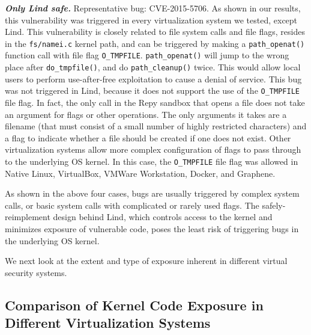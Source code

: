 {{{\emph{\textbf{Only Lind safe.}}  Representative bug: CVE-2015-5706. As
shown in our results, this vulnerability was triggered in every
virtualization system we tested, except Lind. This vulnerability
is closely related to file system calls and file flags, resides in the \texttt{fs/namei.c}
kernel path, and can be triggered by making a \texttt{path\_openat()} function
call with file flag \texttt{O\_TMPFILE}. \texttt{path\_openat()} will jump to the wrong
place after \texttt{do\_tmpfile()}, and do \texttt{path\_cleanup()} twice. This would
allow local users to perform use-after-free exploitation to cause a denial of service.
This bug was not triggered in Lind, because it does not support the use of the
\texttt{O\_TMPFILE} file flag. In fact, the only call in the Repy sandbox that
opens a file does not take an argument for flags or other operations.  The
only arguments it takes are a filename (that must consist of a small number
of highly restricted characters) and a flag to indicate whether a file should
be created if one does not exist.
Other virtualization systems allow more complex configuration of flags to
pass through to the underlying OS kernel.
In this case, the \texttt{O\_TMPFILE} file flag was
allowed in Native Linux, VirtualBox, VMWare Workstation, Docker, and Graphene.


As shown in the above four cases, bugs are usually triggered by
complex system calls,
or basic system calls with complicated or rarely used flags.
The safely-reimplement design behind Lind, which controls access to the kernel and
minimizes exposure of vulnerable code, poses
the least risk of triggering bugs in the underlying OS kernel. 

We next look at the extent and type of exposure inherent in different
virtual security systems.

\subsection{Comparison of Kernel Code Exposure in Different Virtualization
Systems}
\label{Reachable-Kernel-Trace-Analysis-for-Different-Virtualization-Systems}

}}}
